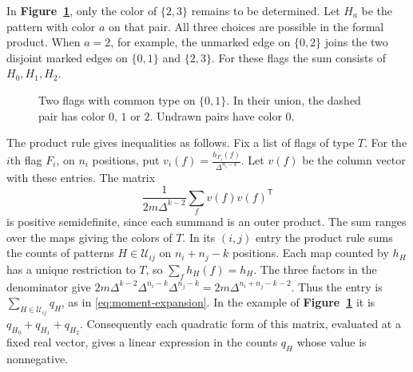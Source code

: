 \documentclass[preprint,11pt,numbers]{elsarticle-arxiv}
\numberwithin{equation}{section}
\theoremstyle{definition}
\begin{document}
In \textbf{Figure~\ref{fig:flag-union}}, only the color of $\{2,3\}$
remains to be determined. Let $H_a$ be the pattern with color $a$
on that pair. All three choices are possible in the formal product.
When $a=2$, for example, the unmarked edge on $\{0,2\}$ joins the
two disjoint marked edges on $\{0,1\}$ and $\{2,3\}$. For these flags
the sum consists of $H_0,H_1,H_2$.

\begin{figure}[htbp]
\centering
{}
\caption{Two flags with common type on $\{0,1\}$. In their union,
the dashed pair has color $0$, $1$ or $2$. Undrawn pairs have color $0$.}
\label{fig:flag-union}
\end{figure}

The product rule gives inequalities as follows. Fix a list of flags of
type $T$. For the $i$th flag $F_i$, on $n_i$ positions, put
$v_i(f)=\frac{h_{F_i}(f)}{\Delta^{n_i-k}}$. Let $v(f)$ be the column
vector with these entries. The matrix
\[
 \frac{1}{2m\Delta^{k-2}}\sum_f v(f)v(f)^{\mathsf T}
\]
is positive semidefinite, since each summand is an outer product.
The sum ranges over the maps giving the colors of $T$. In its
$(i,j)$ entry the product rule sums the counts of patterns
$H\in\mathcal U_{ij}$ on $n_i+n_j-k$ positions. Each map counted by
$h_H$ has a unique restriction to $T$, so $\sum_f h_H(f)=h_H$.
The three factors in the denominator give
$2m\Delta^{k-2}\Delta^{n_i-k}\Delta^{n_j-k}
=2m\Delta^{n_i+n_j-k-2}$. Thus the entry is
$\sum_{H\in\mathcal U_{ij}}q_H$, as in \eqref{eq:moment-expansion}.
In the example of \textbf{Figure~\ref{fig:flag-union}} it is
$q_{H_0}+q_{H_1}+q_{H_2}$. Consequently each quadratic form of this matrix, evaluated at a fixed
real vector, gives a linear expression in the counts $q_H$ whose
value is nonnegative.
\end{document}
